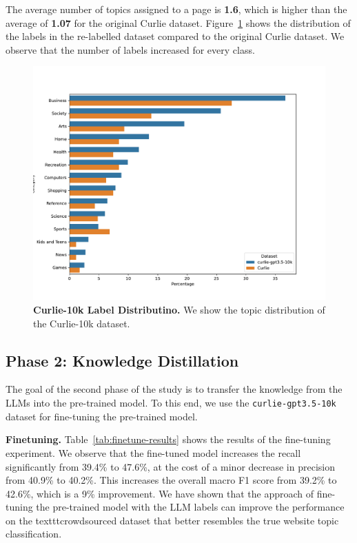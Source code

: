 The average number of topics assigned to a page is \textbf{1.6}, which is higher than the average of \textbf{1.07} for the original Curlie dataset. Figure~\ref{fig:label-distribution-comparison} shows the distribution of the labels in the re-labelled dataset compared to the original Curlie dataset. We observe that the number of labels increased for every class.

\begin{figure}[!h]
    \centering
    \includegraphics[width=.8\columnwidth]{figures/class_distribution_comparison.pdf}
    \caption{\textbf{Curlie-10k Label Distributino.} We show the topic distribution of the Curlie-10k dataset.}
    \label{fig:label-distribution-comparison}
\end{figure}


\subsection*{Phase 2: Knowledge Distillation}


The goal of the second phase of the study is to transfer the knowledge from the LLMs into the pre-trained model. 
To this end, we use the \texttt{curlie-gpt3.5-10k} dataset for fine-tuning the pre-trained model.

\textbf{Finetuning.} Table~\ref{tab:finetune-results} shows the results of the fine-tuning experiment. 
We observe that the fine-tuned model increases the recall significantly from 39.4\% to 47.6\%, at the cost of a minor decrease in precision from 40.9\% to 40.2\%. 
This increases the overall macro F1 score from 39.2\% to 42.6\%, which is a 9\% improvement. 
We have shown that the approach of fine-tuning the pre-trained model with the LLM labels can improve the performance on the texttt{crowdsourced} dataset that better resembles the true website topic classification.

